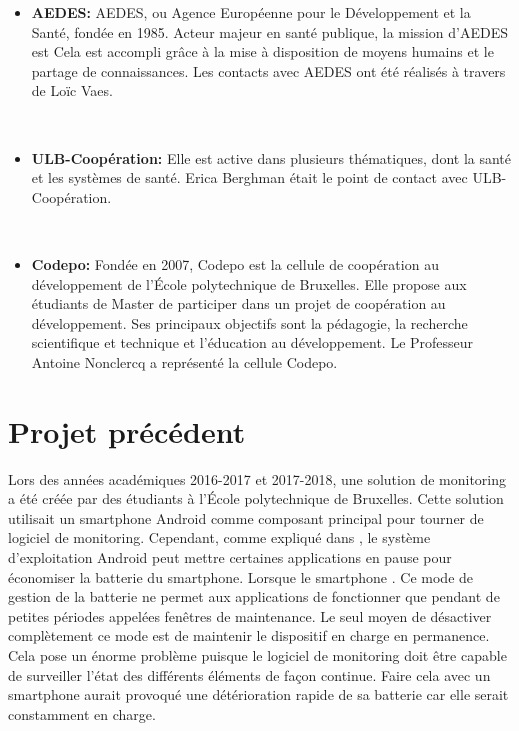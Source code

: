 \begin{itemize}
  \item \textbf{AEDES:} AEDES, ou Agence Européenne pour le Développement et la Santé, \cite{aedes} fondée en 1985. Acteur majeur en santé publique, la mission d'AEDES est \cite{aedes} Cela est accompli grâce à la mise à disposition de moyens humains et le partage de connaissances. Les contacts avec AEDES ont été réalisés à travers de Loïc Vaes.

  ~

  \item \textbf{ULB-Coopération:}  \cite{ulb_coop} Elle est active dans plusieurs thématiques, dont la santé et les systèmes de santé. \cite{ulb_coop} Erica Berghman était le point de contact avec ULB-Coopération.

  ~

  \item \textbf{Codepo:} Fondée en 2007, Codepo est la cellule de coopération au développement de l'École polytechnique de Bruxelles. Elle propose aux étudiants de Master de participer dans un projet de coopération au développement. Ses principaux objectifs sont la pédagogie, la recherche scientifique et technique et l'éducation au développement. \cite{codepo} Le Professeur Antoine Nonclercq a représenté la cellule Codepo.

\end{itemize}

\section{Projet précédent}
\label{sec:projet_precedent}

\noindent
Lors des années académiques 2016-2017 et 2017-2018, une solution de monitoring a été créée par des étudiants à l'École polytechnique de Bruxelles. Cette solution utilisait un smartphone Android comme composant principal pour tourner de logiciel de monitoring. Cependant, comme expliqué dans \cite{delobbe_2017}, le système d'exploitation Android peut mettre certaines applications en pause pour économiser la batterie du smartphone. Lorsque le smartphone  \cite{doze_mode_google}. Ce mode de gestion de la batterie ne permet aux applications de fonctionner que pendant de petites périodes appelées fenêtres de maintenance. Le seul moyen de désactiver complètement ce mode est de maintenir le dispositif en charge en permanence. Cela pose un énorme problème puisque le logiciel de monitoring doit être capable de surveiller l'état des différents éléments de façon continue. Faire cela avec un smartphone aurait provoqué une détérioration rapide de sa batterie car elle serait constamment en charge.

